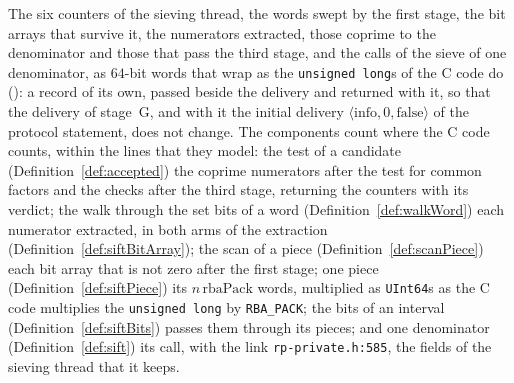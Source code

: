 \begin{definition}\label{def:counters}
  \leanok
  The six counters of the sieving thread, the words swept by the first stage, the bit arrays that
  survive it, the numerators extracted, those coprime to the denominator and those that pass the
  third stage, and the calls of the sieve of one denominator, as $64$-bit words that wrap as the
  \verb|unsigned long|s of the C code do (): a record of its own,
  passed beside the delivery and returned with it, so that the delivery of stage~G, and with it the
  initial delivery $\langle \mathrm{info}, 0, \mathrm{false}\rangle$ of the protocol statement, does
  not change. The components count where the C code counts, within the lines that they model: the
  test of a candidate (Definition~\ref{def:accepted}) the coprime numerators after the test for
  common factors and the checks after the third stage, returning the counters with its verdict; the
  walk through the set bits of a word (Definition~\ref{def:walkWord}) each numerator extracted, in
  both arms of the extraction (Definition~\ref{def:siftBitArray}); the scan of a piece
  (Definition~\ref{def:scanPiece}) each bit array that is not zero after the first stage; one piece
  (Definition~\ref{def:siftPiece}) its $n\,\mathrm{rbaPack}$ words, multiplied as \verb|UInt64|s as
  the C code multiplies the \verb|unsigned long| by \verb|RBA_PACK|; the bits of an interval
  (Definition~\ref{def:siftBits}) passes them through its pieces; and one denominator
  (Definition~\ref{def:sift}) its call, with the link \verb|rp-private.h:585|, the fields of the
  sieving thread that it keeps.
\end{definition}

